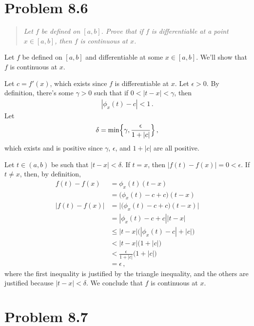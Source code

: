 \documentclass{article}
\begin{document}
\qedsymbol

\section*{Problem 8.6}

\begin{quote}
    \itshape
    Let $f$ be defined on $[a,b]$. Prove that if $f$ is
    differentiable at a point $x \in [a,b]$, then $f$ is
    continuous at $x$.
\end{quote}

Let $f$ be defined on $[a,b]$ and differentiable at some
$x \in [a,b]$. We'll show that $f$ is continuous at $x$.

Let $c = f'(x)$, which exists since $f$ is differentiable at $x$.
Let $\epsilon > 0$.
By definition, there's some $\gamma > 0$
such that if $0 < |t-x| < \gamma$, then
\begin{gather*}
    |\phi_x(t) - c| < 1 \,.
\end{gather*}
Let
\begin{align*}
    \delta = \min \Bigl\{ \gamma, \frac{\epsilon}{1 + |c|} \Bigr\} \,,
\end{align*}
which exists and is positive since $\gamma$, $\epsilon$, and
$1 + |c|$ are all positive.

Let $t \in (a,b)$ be such that $|t-x| < \delta$. If $t = x$, then
$\bigl|f(t) - f(x)\bigr| = 0 < \epsilon$.
If $t \neq x$, then, by definition,
\begin{align*}
    f(t) - f(x) &= \phi_x(t)(t-x) \\
    &= \bigl(\phi_x(t) - c +c \bigr)(t-x) \\
    \bigl|f(t) - f(x)\bigr| &= \bigl|\bigl(\phi_x(t) - c +c \bigr)(t-x)\bigr| \\
    &= |\phi_x(t) - c +c||t-x| \\
    &\leq |t-x| \bigl( |\phi_x(t) - c| + |c| \bigr) \\
    &< |t-x| \bigl( 1 + |c| \bigr) \\
    &< \frac{\epsilon}{1 + |c|} \bigl(1 + |c|\bigr) \\
    &= \epsilon \,,
\end{align*}
where the first inequality is justified by the triangle inequality,
and the others are justified because $|t-x| < \delta$.
We conclude that $f$ is continuous at $x$.

\qedsymbol

\section*{Problem 8.7}
\end{document}
